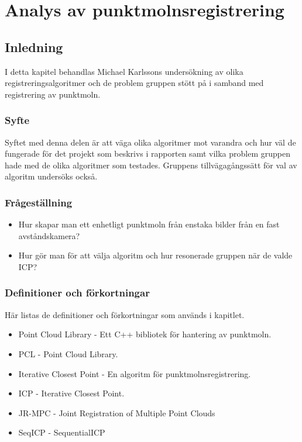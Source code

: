 \chapter{Analys av punktmolnsregistrering}
\label{cha:indiv-report-karlsson}


\section{Inledning}
\label{sec:introduction-karlsson}

I detta kapitel behandlas Michael Karlssons undersökning av olika registreringsalgoritmer och de problem gruppen stött på i samband med registrering av punktmoln.

\subsection{Syfte}
\label{sec:purpose-karlsson}

Syftet med denna delen är att väga olika algoritmer mot varandra och hur väl de fungerade för det projekt som beskrivs i rapporten samt vilka problem gruppen hade med de olika algoritmer som testades. Gruppens tillvägagångssätt för val av algoritm undersöks också.


\subsection{Frågeställning}
\label{sec:issue-karlsson}

\begin{itemize}
	\item Hur skapar man ett enhetligt punktmoln från enstaka bilder från en fast \newline avståndskamera?
	\item Hur gör man för att välja algoritm och hur resonerade gruppen när de valde ICP?	
\end{itemize}

\subsection{Definitioner och förkortningar}
\label{sec:definitions-acronyms-karlsson}

Här listas de definitioner och förkortningar som används i kapitlet.

\begin{itemize}
	\item Point Cloud Library - Ett C++ bibliotek för hantering av punktmoln.
	\item PCL - Point Cloud Library.
	\item Iterative Closest Point - En algoritm för punktmolnsregistrering.
	\item ICP - Iterative Closest Point.
	\item JR-MPC - Joint Registration of Multiple Point Clouds
	\item SeqICP - SequentialICP
\end{itemize}


